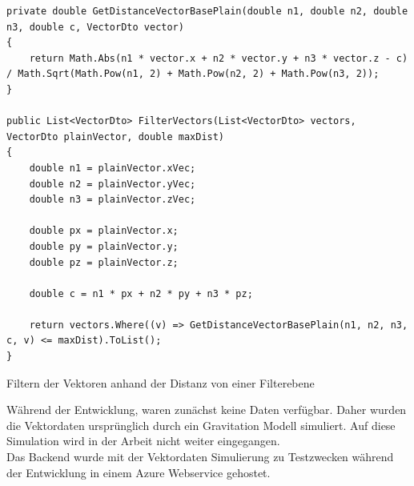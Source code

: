 \begin{codefig}
	\centering
	\lstset{style=sharpc}
	\begin{lstlisting}
private double GetDistanceVectorBasePlain(double n1, double n2, double n3, double c, VectorDto vector)
{
	return Math.Abs(n1 * vector.x + n2 * vector.y + n3 * vector.z - c) / Math.Sqrt(Math.Pow(n1, 2) + Math.Pow(n2, 2) + Math.Pow(n3, 2));
}

public List<VectorDto> FilterVectors(List<VectorDto> vectors, VectorDto plainVector, double maxDist)
{
	double n1 = plainVector.xVec;
	double n2 = plainVector.yVec;
	double n3 = plainVector.zVec;

	double px = plainVector.x;
	double py = plainVector.y;
	double pz = plainVector.z;

	double c = n1 * px + n2 * py + n3 * pz;

	return vectors.Where((v) => GetDistanceVectorBasePlain(n1, n2, n3, c, v) <= maxDist).ToList();
}
	\end{lstlisting}
	\caption{Filtern der Vektoren anhand der Distanz von einer Filterebene}
	\label{codefig:FilterVectors}
\end{codefig}
Während der Entwicklung, waren zunächst keine Daten verfügbar. Daher wurden die Vektordaten ursprünglich durch ein Gravitation Modell simuliert. Auf diese Simulation wird in der Arbeit nicht weiter eingegangen.\\
Das Backend wurde mit der Vektordaten Simulierung zu Testzwecken während der Entwicklung in einem Azure Webservice gehostet.

